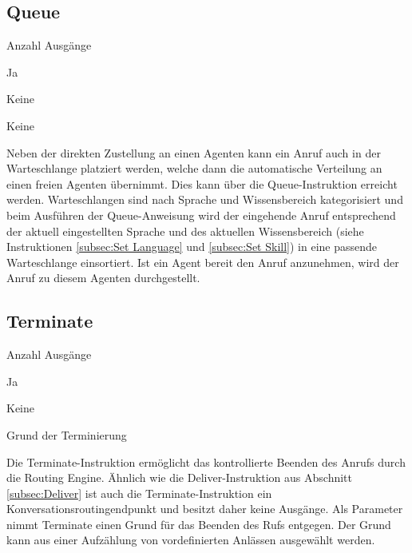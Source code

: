 \subsection{Queue}
\label{subsec:Queue}
\begin{labeling}{Anzahl Ausgänge}
\item [Eingang] Ja
\item [Anzahl Ausgänge] Keine
\item [Parameter] Keine
\item [Beschreibung] Neben der direkten Zustellung an einen Agenten kann ein Anruf auch in der Warteschlange platziert werden, welche dann die automatische Verteilung an einen freien Agenten übernimmt. Dies kann über die Queue-Instruktion erreicht werden. Warteschlangen sind nach Sprache und Wissensbereich kategorisiert und beim Ausführen der Queue-Anweisung wird der eingehende Anruf entsprechend der aktuell eingestellten Sprache und des aktuellen Wissensbereich (siehe Instruktionen \ref{subsec:Set Language} und \ref{subsec:Set Skill}) in eine passende Warteschlange einsortiert. Ist ein Agent bereit den Anruf anzunehmen, wird der Anruf zu diesem Agenten durchgestellt.
\end{labeling}

\subsection{Terminate}
\begin{labeling}{Anzahl Ausgänge}
\item [Eingang] Ja
\item [Anzahl Ausgänge] Keine
\item [Parameter] Grund der Terminierung
\item [Beschreibung] Die Terminate-Instruktion ermöglicht das kontrollierte Beenden des Anrufs durch die Routing Engine. Ähnlich wie die Deliver-Instruktion aus Abschnitt \ref{subsec:Deliver} ist auch die Terminate-Instruktion ein Konversationsroutingendpunkt und besitzt daher keine Ausgänge. Als Parameter nimmt Terminate einen Grund für das Beenden des Rufs entgegen. Der Grund kann aus einer Aufzählung von vordefinierten Anlässen ausgewählt werden.
\end{labeling}

